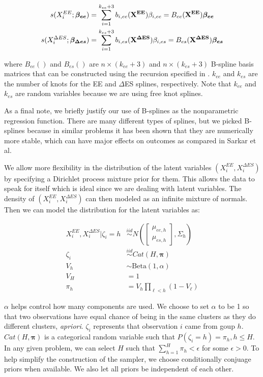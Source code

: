 \documentclass[11pt]{article}\usepackage[]{graphicx}\usepackage[]{color}
\begin{document}
\begin{align}
  s(X_i^{EE};\boldsymbol{\beta_{ee}}) &= \sum_{i=1}^{k_{ee}+3} b_{i,ee}({\bf X^{EE}}) \beta_{i,ee} = B_{ee}({\bf X^{EE}}) \boldsymbol{\beta_{ee}}\\
  s(X_i^{\Delta ES};\boldsymbol{\beta_{\Delta es}}) &= \sum_{i=1}^{k_{es}+3} b_{i,es}({\bf X^{\Delta ES}}) \beta_{i,es} = B_{es}({\bf X^{\Delta ES}}) \boldsymbol{\beta_{es}}
\end{align}

where $B_{ee}()$ and $B_{es}()$ are $n\times (k_{ee}+3)$ and $n \times (k_{es}+3)$ B-spline basis matrices that can be constructed using the recursion specified in \cite{nonparametric}. $k_{ee}$ and $k_{es}$ are the number of knots for the EE and $\Delta$ES splines, respectively. Note that $k_{ee}$ and $k_{es}$ are random variables because we are using free knot splines.


As a final note, we briefly justify our use of B-splines as the nonparametric regression function. There are many different types of splines, but we picked B-splines because in similar problems it has been shown that they are numerically more stable, which can have major effects on outcomes as compared in Sarkar et al. \cite{sarkar14} 

We allow more flexibility in the distribution of the latent variables $(X_i^{EE},X_i^{\Delta ES})$ by specifying a Dirichlet process mixture prior for them. This allows the data to speak for itself which is ideal since we are dealing with latent variables. The density of $(X_i^{EE},X_i^{\Delta ES})$ can then modeled as an infinite mixture of normals.  Then we can model the distribution for the latent variables as:

\begin{align}
X_i^{EE},X_i^{\Delta ES}|\zeta_i=h &\overset{iid}{\sim}  N\left( 
  \begin{bmatrix}
  \mu_{ee,h} \\
  \mu_{es,h} 
  \end{bmatrix}
  ,
  \Sigma_{h}
    \right) \\
    \zeta_i &\overset{iid}{\sim} Cat(H,\boldsymbol{\pi}) \\
    V_h &\sim \text{Beta}(1,\alpha) \\
    V_H & = 1 \\
    \pi_h &= V_h \prod_{\ell < h} (1-V_{\ell}) 
\end{align}


$\alpha$ helps control how many components are used. We choose to set $\alpha$ to be  1 so that two observations have equal chance of being in the same clusters as they do different clusters, \emph{apriori}. $\zeta_i$ represents that observation $i$ came from goup $h$. $Cat(H,\boldsymbol{\pi})$ is a categorical random variable such that $P(\zeta_i=h)=\pi_h, h \leq H$. In any given problem, we can select $H$ such that $\sum_{h=1}^{H} \pi_h < \epsilon$ for some  $\epsilon > 0$.   To help simplify the construction of the sampler, we choose conditionally conjuage priors when available.  We also let  all priors be independent of each other. 
\end{document}
